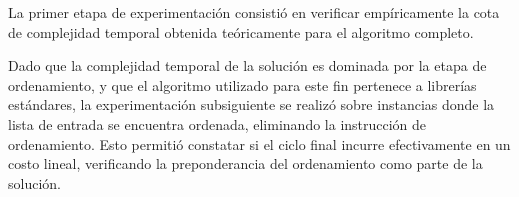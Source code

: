 La primer etapa de experimentación consistió en verificar empíricamente la cota de complejidad temporal obtenida teóricamente para el algoritmo completo.

Dado que la complejidad temporal de la solución es dominada por la etapa de ordenamiento, y que el algoritmo utilizado para este fin pertenece a librerías estándares, la experimentación subsiguiente se realizó sobre instancias donde la lista de entrada se encuentra ordenada, eliminando la instrucción de ordenamiento. Esto permitió constatar si el ciclo final incurre efectivamente en un costo lineal, verificando la preponderancia del ordenamiento como parte de la solución.